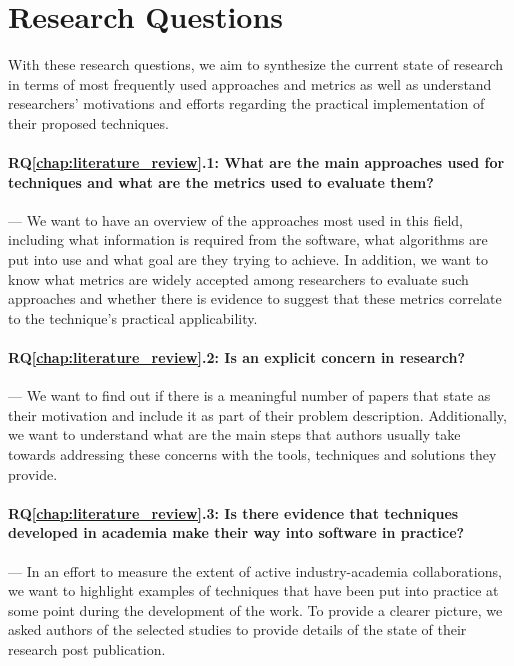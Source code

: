 \section{Research Questions}\label{sec:lit_rqs}

With these research questions, we aim to synthesize the current state of \rt research in terms of most frequently used approaches and metrics as well as understand researchers' motivations and efforts regarding the practical implementation of their proposed techniques.

\paragraph{RQ\ref{chap:literature_review}.1: What are the main approaches used for \rt techniques and what are the metrics used to evaluate them?} --- We want to have an overview of the approaches most used in this field, including what information is required from the software, what algorithms are put into use and what goal are they trying to achieve. In addition, we want to know what metrics are widely accepted among researchers to evaluate such approaches and whether there is evidence to suggest that these metrics correlate to the technique's practical applicability.

\paragraph{RQ\ref{chap:literature_review}.2: Is \rea an explicit concern in \rt research?} --- We want to find out if there is a meaningful number of papers that state \rea as their motivation and include it as part of their problem description. Additionally, we want to understand what are the main steps that authors usually take towards addressing these concerns with the tools, techniques and solutions they provide.
    
\paragraph{RQ\ref{chap:literature_review}.3: Is there evidence that techniques developed in academia make their way into software in practice?} --- In an effort to measure the extent of active industry-academia collaborations, we want to highlight examples of techniques that have been put into practice at some point during the development of the work. To provide a clearer picture, we asked authors of the selected studies to provide details of the state of their research post publication.
